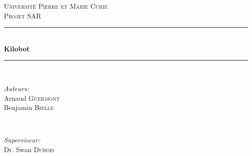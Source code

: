 \documentclass[a4paper,8pt]{report}
\begin{document}
\begin{titlepage}
\newcommand{\HRule}{\rule{\linewidth}{0.5mm}} %
\center %
 

\textsc{\LARGE Universit\'e Pierre et Marie Curie}\\[1.5cm] %
\textsc{\Large Projet SAR}\\[0.5cm] %


\HRule \\[0.4cm]
{ \huge \bfseries Kilobot}\\[0.4cm] %
\HRule \\[1.5cm]
 

\begin{minipage}{0.4\textwidth}
\begin{flushleft} \large
\emph{Auteurs:}\\
Arnaud \textsc{Guermont} %
\\Benjamin \textsc{Bielle} %
\end{flushleft}
\end{minipage}
~
\begin{minipage}{0.4\textwidth}
\begin{flushright} \large
\emph{Superviseur:} \\
Dr. Swan \textsc{Dubois} %
\end{flushright}
\end{minipage}\\[4cm]



\end{titlepage}
\end{document}
